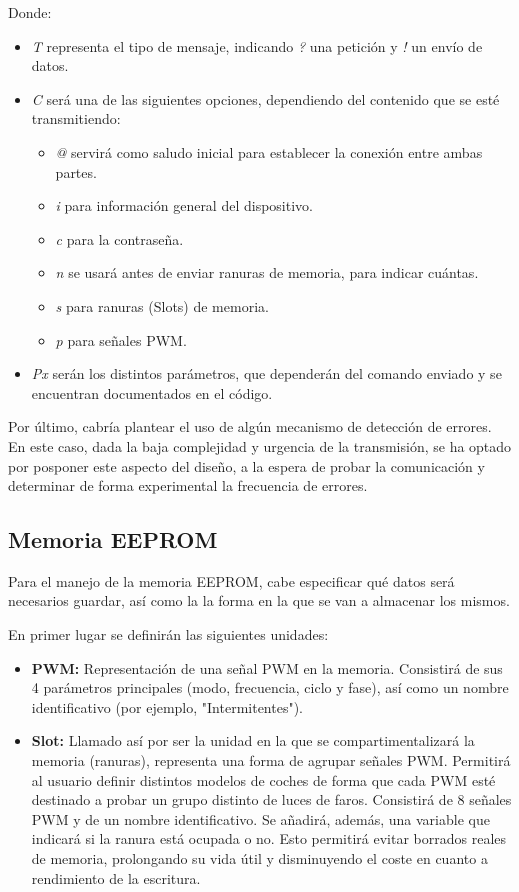 Donde:

\begin{itemize}
    \item\textit{T} representa el tipo de mensaje, indicando \textit{?} una petición y \textit{!} un envío de datos.
    \item\textit{C} será una de las siguientes opciones, dependiendo del contenido que se esté transmitiendo:
        \begin{itemize}
            \item\textit{@} servirá como saludo inicial para establecer la conexión entre ambas partes.
            \item\textit{i} para información general del dispositivo.
            \item\textit{c} para la contraseña.
            \item\textit{n} se usará antes de enviar ranuras de memoria, para indicar cuántas.
            \item\textit{s} para ranuras (Slots) de memoria.
            \item\textit{p} para señales PWM.
        \end{itemize}
    \item\textit{Px} serán los distintos parámetros, que dependerán del comando enviado y se encuentran documentados en el código.
\end{itemize}

Por último, cabría plantear el uso de algún mecanismo de detección de errores. En este caso, dada la baja complejidad y urgencia de la transmisión, se ha optado por posponer este aspecto del diseño, a la espera de probar la comunicación y determinar de forma experimental la frecuencia de errores.

\subsection{Memoria EEPROM}

Para el manejo de la memoria EEPROM, cabe especificar qué datos será necesarios guardar, así como la la forma en la que se van a almacenar los mismos.

En primer lugar se definirán las siguientes unidades:

\begin{itemize}
    \item\textbf{PWM:} Representación de una señal PWM en la memoria. Consistirá de sus 4 parámetros principales (modo, frecuencia, ciclo y fase), así como un nombre identificativo (por ejemplo, "Intermitentes").
    \item\textbf{Slot:} Llamado así por ser la unidad en la que se compartimentalizará la memoria (ranuras), representa una forma de agrupar señales PWM. Permitirá al usuario definir distintos modelos de coches de forma que cada PWM esté destinado a probar un grupo distinto de luces de faros. Consistirá de 8 señales PWM y de un nombre identificativo. Se añadirá, además, una variable que indicará si la ranura está ocupada o no. Esto permitirá evitar borrados reales de memoria, prolongando su vida útil y disminuyendo el coste en cuanto a rendimiento de la escritura.
\end{itemize}


